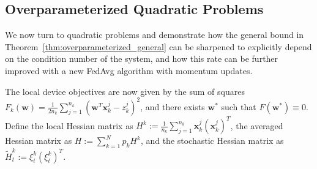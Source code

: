 \subsection{Overparameterized Quadratic Problems}
We now turn to quadratic problems
and demonstrate how the general bound in Theorem~\ref{thm:overparameterized_general}
can be sharpened to explicitly depend on the condition number of the
system, and how this rate can be further improved with a new FedAvg
algorithm with momentum updates. 

The local device objectives are now given by the sum of squares {\small$F_{k}(\mathbf{w})=\frac{1}{2n_{k}}\sum_{j=1}^{n_{k}}(\mathbf{w}^{T}\mathbf{x}_{k}^{j}-z_{k}^{j})^{2}$},
and there exists $\mathbf{w}^{\ast}$ such that $F(\mathbf{w}^{\ast})\equiv0$.
Define the local Hessian matrix as $H^{k}:=\frac{1}{n_{k}}\sum_{j=1}^{n_{k}}\mathbf{x}_{k}^{j}(\mathbf{x}_{k}^{j})^{T}$,
the averaged Hessian matrix as $H:=\sum_{k=1}^{N}p_{k}H^{k}$, and the stochastic Hessian matrix as $\tilde{H}_{t}^{k}:=\xi_{t}^{k}(\xi_{t}^{k})^{T}$. 
\begin{comment}
In general $H$ has zero eigevalues. However, because the null space
of $H$ and range of $H$ are orthogonal, in our subsequence analysis
it suffices to project $\overline{\mathbf{w}}_{t}-\mathbf{w}^{\ast}$
onto the range of $H$, thus we may restrict to the non-zero eigenvalue
of $H$. We can use $\mathbf{w}^{\ast T}\mathbf{x}_{k}^{j}-z_{k}^{j}\equiv0$
to rewrite the local objectives as $F_{k}(\mathbf{w})=\frac{1}{2}\langle\mathbf{w}-\mathbf{w}^{\ast},H^{k}(\mathbf{w}-\mathbf{w}^{\ast})\rangle\equiv\frac{1}{2}\|\mathbf{w}-\mathbf{w}^{\ast}\|_{H^{k}}^{2}$
so that $F(\mathbf{w})=\frac{1}{2}\|\mathbf{w}-\mathbf{w}^{\ast}\|_{H}^{2}$.
\end{comment}
\begin{comment}
\begin{align*}
F_{k}(w) & =\frac{1}{2n_{k}}\sum_{j=1}^{n_{k}}(w^{T}x_{k,j}-z_{k,j}-(w^{\ast T}x_{k,j}-z_{k,j}))^{2}=\frac{1}{2n_{k}}\sum_{j=1}^{n_{k}}((w-w^{\ast})^{T}x_{k,j})^{2}\\
& =\frac{1}{2}\langle w-w^{\ast},H^{k}(w-w^{\ast})\rangle=\frac{1}{2}\|w-w^{\ast}\|_{H^{k}}^{2}
\end{align*}
\end{comment}
\begin{comment}
Let $\xi_{t}^{k}$ be the stochastic sample on the $k$th device at
time $t$, and define $\tilde{H}_{t}^{k}:=\xi_{t}^{k}(\xi_{t}^{k})^{T}$
as the stochastic Hessian matrix. %
\end{comment}
